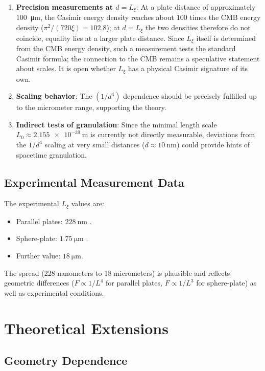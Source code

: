 	\begin{enumerate}
		\item \textbf{Precision measurements at \( d = L_\xi \)}: At a plate distance of approximately \SI{100}{\micro\meter}, the Casimir energy density reaches about $100$ times the CMB energy density ($\pi^2/(720\xi)=102.8$); at $d=L_\xi$ the two densities therefore do not coincide, equality lies at a larger plate distance. Since \( L_\xi \) itself is determined from the CMB energy density, such a measurement tests the standard Casimir formula; the connection to the CMB remains a speculative statement about scales. It is open whether \( L_\xi \) has a physical Casimir signature of its own.
		\item \textbf{Scaling behavior}: The \( (1/d^4) \) dependence should be precisely fulfilled up to the micrometer range, supporting the theory.
		\item \textbf{Indirect tests of granulation}: Since the minimal length scale \( L_0 \approx \SI{2.155e-39}{\meter} \) is currently not directly measurable, deviations from the \( 1/d^4 \) scaling at very small distances (\( d \approx \SI{10}{\nano\meter} \)) could provide hints of spacetime granulation.
	\end{enumerate}
	
	\subsection{Experimental Measurement Data}
	
	The experimental \( L_\xi \) values are:
	\begin{itemize}
		\item Parallel plates: \( \SI{228}{\nano\meter} \) \cite{dhital2024}.
		\item Sphere-plate: \( \SI{1.75}{\micro\meter} \) \cite{xu2022}.
		\item Further value: \( \SI{18}{\micro\meter} \).
	\end{itemize}
	
	The spread (228 nanometers to 18 micrometers) is plausible and reflects geometric differences (\( F \propto 1/L^4 \) for parallel plates, \( F \propto 1/L^3 \) for sphere-plate) as well as experimental conditions.
	
	\section{Theoretical Extensions}
	
	\subsection{Geometry Dependence}
	
